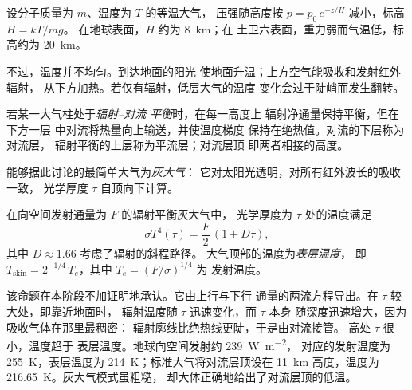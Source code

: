 设分子质量为 $m$、温度为 $T$ 的等温大气，
压强随高度按 $p = p_0\,e^{-z/H}$ 减小，标高 $H = kT/mg$。
在地球表面，$H$ 约为 \qty{8}{km}；在
土卫六表面，重力弱而气温低，标高约为 \qty{20}{km}。

不过，温度并不均匀。到达地面的阳光
使地面升温；上方空气能吸收和发射红外辐射，
从下方加热。若仅有辐射，低层大气的温度
变化会过于陡峭而发生翻转。

\begin{definition}[辐射–对流平衡]\label{def:b3:planetary-atmospheres:rce}
若某一大气柱处于\emph{辐射–对流
平衡}时，在每一高度上
辐射净通量保持平衡，但在下方一层
中对流将热量向上输送，并使温度梯度
保持在绝热值。对流的下层称为对流层，
辐射平衡的上层称为平流层；对流层顶
即两者相接的高度。
\end{definition}

能够据此讨论的最简单大气为\emph{灰大气}：
它对太阳光透明，对所有红外波长的吸收一致，
光学厚度 $\tau$ 自顶向下计算。

\begin{proposition}[灰大气辐射平衡]\label{prop:b3:planetary-atmospheres:grey}
在向空间发射通量为 $F$ 的辐射平衡灰大气中，
光学厚度为 $\tau$ 处的温度满足
\[
\sigma T^4(\tau) = \frac F2\,(1 + D\tau),
\]
其中 $D \approx 1.66$ 考虑了辐射的斜程路径。
大气顶部的温度为\emph{表层温度}，
即 $T_\mathrm{skin} = 2^{-1/4}\,T_e$，其中 $T_e = (F/\sigma)^{1/4}$ 为
发射温度。
\end{proposition}

该命题在本阶段不加证明地承认。它由上行与下行
通量的两流方程导出。在 $\tau$ 较大处，即靠近地面时，
辐射温度随 $\tau$ 迅速变化，而 $\tau$ 本身
随深度迅速增大，因为吸收气体在那里最稠密：
辐射廓线比绝热线更陡，于是由对流接管。
高处 $\tau$ 很小，温度趋于
表层温度。地球向空间发射约 \qty{239}{W.m^{-2}}，
对应的发射温度为 \qty{255}{K}，表层温度为
\qty{214}{K}；标准大气将对流层顶设在 \qty{11}{km}
高度，温度为 \qty{216.65}{K}。灰大气模式虽粗糙，
却大体正确地给出了对流层顶的低温。

